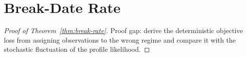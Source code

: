 \section{Break-Date Rate}\label{app:break-rate-proof}

\begin{proof}[Proof of Theorem~\ref{thm:break-rate}]
Proof gap: derive the deterministic objective loss from assigning observations to the wrong regime and compare it with the stochastic fluctuation of the profile likelihood.
\end{proof}


